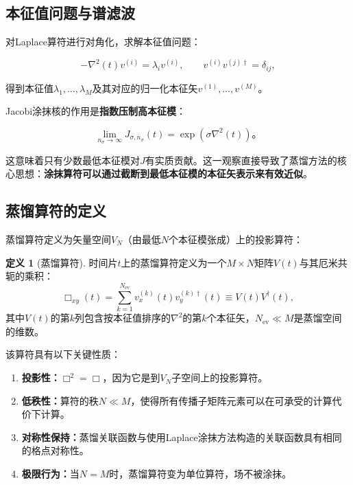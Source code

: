 \documentclass[12pt,a4paper]{ctexart}
\theoremstyle{definition}
\newtheorem{definition}{定义}[section]
\begin{document}
\subsection{本征值问题与谱滤波}

对Laplace算符进行对角化，求解本征值问题\cite{Peardon2009,NoteGluonPDFs}：

\begin{equation}
-\nabla^2(t) v^{(i)} = \lambda_i v^{(i)}, \qquad v^{(i)} v^{(j)\dagger} = \delta_{ij},
\label{eq:eigenvalue}
\end{equation}

得到本征值$\lambda_1, \ldots, \lambda_M$及其对应的归一化本征矢$v^{(1)}, \ldots, v^{(M)}$。

Jacobi涂抹核的作用是\textbf{指数压制高本征模}\cite{NoteGluonPDFs}：

\begin{equation}
\lim_{n_\sigma \to \infty} J_{\sigma,n_\sigma}(t) = \exp(\sigma\nabla^2(t))。
\label{eq:jacobi_limit}
\end{equation}

这意味着只有少数最低本征模对$J$有实质贡献。这一观察直接导致了蒸馏方法的核心思想：\textbf{涂抹算符可以通过截断到最低本征模的本征矢表示来有效近似}\cite{Peardon2009}。

\subsection{蒸馏算符的定义}

蒸馏算符定义为矢量空间$V_N$（由最低$N$个本征模张成）上的投影算符\cite{Peardon2009,NoteGluonPDFs}：

\begin{definition}[蒸馏算符]
时间片$t$上的蒸馏算符定义为一个$M \times N$矩阵$V(t)$与其厄米共轭的乘积：
\begin{equation}
\Box_{xy}(t) = \sum_{k=1}^{N_{\text{ev}}} v^{(k)}_x(t) v^{(k)\dagger}_y(t) \equiv V(t)V^\dagger(t),
\label{eq:distillation_operator}
\end{equation}
其中$V(t)$的第$k$列包含按本征值排序的$\nabla^2$的第$k$个本征矢，$N_{\text{ev}} \ll M$是蒸馏空间的维数。
\end{definition}

该算符具有以下关键性质\cite{Peardon2009}：

\begin{enumerate}
    \item \textbf{投影性：}$\Box^2 = \Box$，因为它是到$V_N$子空间上的投影算符。
    \item \textbf{低秩性：}算符的秩$N \ll M$，使得所有传播子矩阵元素可以在可承受的计算代价下计算。
    \item \textbf{对称性保持：}蒸馏关联函数与使用Laplace涂抹方法构造的关联函数具有相同的格点对称性。
    \item \textbf{极限行为：}当$N = M$时，蒸馏算符变为单位算符，场不被涂抹。
\end{enumerate}
\end{document}
